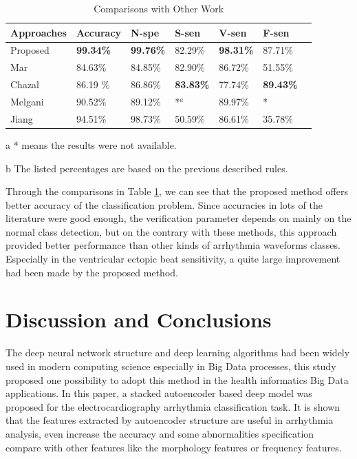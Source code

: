 \documentclass[journal]{IEEEtran}
\begin{document}
\begin{table}[!htbp]
\begin{center}
\begin{threeparttable}
\caption{Comparisons with Other Work}
\label{table5}
\begin{tabular}{lllllll}
\hline

Approaches            &  Accuracy & N-spe & S-sen & V-sen & F-sen \\
\hline
 Proposed             & \textbf{99.34\%}  & \textbf{99.76\%} &  82.29\% & \textbf{98.31\%} & 87.71\% \\
 Mar\cite{mar}        & 84.63\%  & 84.85\% & 82.90\%  & 86.72\% & 51.55\% \\
 Chazal\cite{chaza}   & 86.19 \% & 86.86\% & \textbf{83.83\%}  & 77.74\% & \textbf{89.43\%} \\
 Melgani\cite{melgan} & 90.52\%  & 89.12\% & *$^a$    & 89.97\% & * \\
 Jiang \cite{jiang}   & 94.51\%  & 98.73\% & 50.59\%  & 86.61\% & 35.78\% \\
\hline
\end{tabular}
\begin{tablenotes}
\item [a] * means the results were not available.
\item [b] The listed percentages are based on the previous described rules.
\end{tablenotes}
\end{threeparttable}
\end{center}
\end{table}

Through the comparisons in Table \ref{table5}, we can see that the proposed method offers better accuracy of the classification problem. Since accuracies in lots of the literature were good enough, the verification parameter depends on mainly on the normal class detection, but on the contrary with these methods, this approach provided better performance than other kinds of arrhythmia waveforms classes. Especially in the ventricular ectopic beat sensitivity, a quite large improvement had been made by the proposed method.

\section{Discussion and Conclusions}
The deep neural network structure and deep learning algorithms had been widely used in modern computing science especially in Big Data processes, this study proposed one possibility to adopt this method in the health informatics Big Data applications. In this paper, a stacked autoencoder based deep model was proposed for the electrocardiography arrhythmia classification task. It is shown that the features extracted by autoencoder structure are useful in arrhythmia analysis, even increase the accuracy and some abnormalities specification compare with other features like the morphology features or frequency features.
\end{document}
